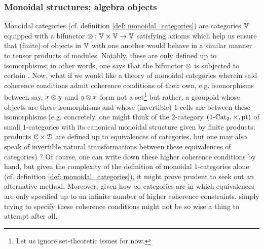             \subsubsection{Monoidal structures; algebra objects}
                Monoidal categories (cf. definition \ref{def: monoidal_categories}) are categories $\mathbb{V}$ equipped with a bifunctor $\tensor: \V \x \V \to \V$ satisfying axioms which help us ensure that (finite)  of objects in $\mathbb{V}$ with one another would behave in a similar manner to tensor products of modules. Notably, these  are only defined up to isomorphisms; in other words, one says that the bifunctor $\tensor$ is subjected to certain . Now, what if we would like a theory of monoidal categories wherein said coherence conditions admit coherence conditions of their own, e.g. isomorphisms between say, $x \tensor y$ amd $y \tensor x$ form not a set\footnote{Let us ignore set-theoretic issues for now.} but rather, a groupoid whose objects are these isomorphisms and whose (invertible) $1$-cells are  between these isomorphisms (e.g. concretely, one might think of the $2$-category $(1\-\Cat_2, \x, \pt)$ of small $1$-categories with its canonical monoidal structure given by finite products: products $\C \x \D$ are defined up to equivalences of categories, but one may also speak of invertible natural transformations between these equivalences of categories) ? Of course, one can write down these higher coherence conditions by hand, but given the complexity of the definition of monoidal $1$-categories alone (cf. definition \ref{def: monoidal_categories}), it might prove prudent to seek out an alternative method. Moreover, given how $\infty$-categories are  in which equivalences are only specified up to an infinite number of higher coherence constraints, simply trying to specify these coherence conditions might not be so wise a thing to attempt after all.
                
